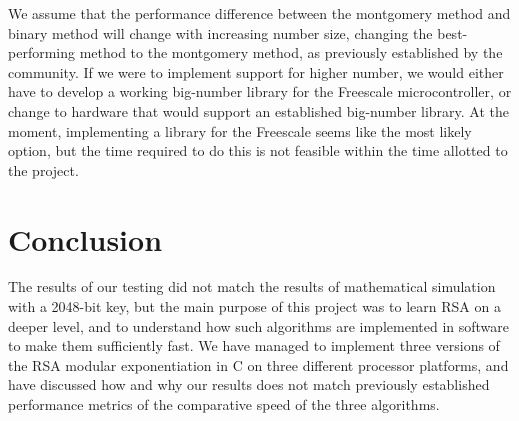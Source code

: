 \documentclass[twocolumn]{IEEEtran}
\begin{document}
We assume that the performance difference between the montgomery method and binary method will change with increasing number size, changing the best-performing method to the montgomery method, as previously established by the community. If we were to implement support for higher number, we would either have to develop a working big-number library for the Freescale microcontroller, or change to hardware that would support an established big-number library. At the moment, implementing a library for the Freescale seems like the most likely option, but the time required to do this is not feasible within the time allotted to the project.

\section{Conclusion}
The results of our testing did not match the results of mathematical simulation with a 2048-bit key, but the main purpose of this project was to learn RSA on a deeper level, and to understand how such algorithms are implemented in software to make them sufficiently fast. We have managed to implement three versions of the RSA modular exponentiation in C on three different processor platforms, and have discussed how and why our results does not match previously established performance metrics of the comparative speed of the three algorithms.



\end{document}
